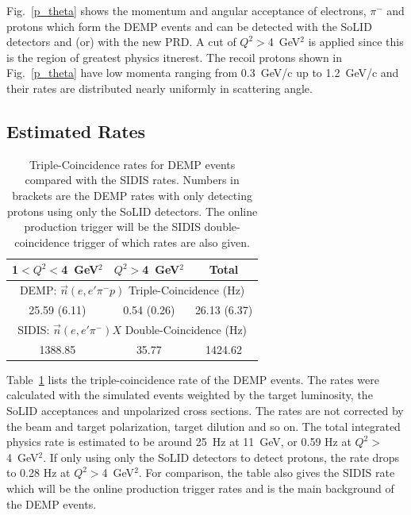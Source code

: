 Fig.~\ref{p_theta} shows the momentum and angular acceptance of electrons,
$\pi^{-}$ and protons which form the DEMP events and can be detected with the
SoLID detectors and (or) with the new PRD.  A cut of $Q^2>$4~GeV$^2$
is applied since this is the region of greatest physics itnerest.  The recoil
protons shown in Fig.~\ref{p_theta} have low momenta ranging from 0.3~GeV/c up
to 1.2~GeV/c and their rates are distributed nearly uniformly in scattering
angle.

\subsection{Estimated Rates}

\begin{table}[!ht]
\centering
\begin{tabular}{|c|c|c|}
 \hline
  1$<Q^2<$4~GeV$^2$ & $Q^2>$4~GeV$^2$ & Total\\
 \hline
\multicolumn{3}{|c|}{DEMP: $\vec{n}(e,e'\pi^{-}p)$ Triple-Coincidence (Hz)}\\
 \hline
 25.59 (6.11)   &  0.54 (0.26) & 26.13 (6.37)   \\
 \hline
\multicolumn{3}{|c|}{SIDIS: $\vec{n}(e,e'\pi^{-})X$ Double-Coincidence (Hz)}\\
 \hline
        1388.85 & 35.77        & 1424.62   \\
 \hline
\end{tabular}
\caption[Triple-Coincidence rates for
  neutron-DEMP]{\footnotesize{Triple-Coincidence rates for DEMP events compared
    with the SIDIS rates. Numbers in brackets are the DEMP rates with only
    detecting protons using only the SoLID detectors. The online production
    trigger will be the SIDIS double-coincidence trigger of which rates are
    also given.}}
\label{rate_table}
\end{table} 

Table~\ref{rate_table} lists the triple-coincidence rate of the DEMP
events. The rates were calculated with the simulated events weighted by the
target luminosity, the SoLID acceptances and unpolarized cross sections. The
rates are not corrected by the beam and target polarization, target dilution
and so on. The total integrated physics rate is estimated to be around 25~Hz at
11~GeV, or 0.59 Hz at $Q^{2}>$4~GeV$^{2}$. If only using only the 
SoLID detectors to detect protons, the rate drops to 0.28 Hz at
$Q^{2}>$4~GeV$^{2}$.  For comparison, the table also gives the SIDIS rate
which will be the online production trigger rates and is the main background of
the DEMP events.

